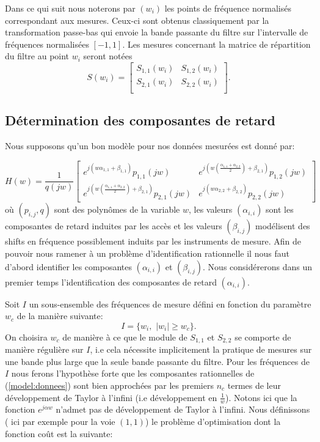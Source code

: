 \documentclass[12]{article}
\begin{document}
Dans ce qui suit nous noterons par $(w_i)$ les points de fr\'equence
normalis\'es correspondant aux mesures. Ceux-ci sont obtenus
classiquement par la transformation passe-bas qui envoie la bande
passante du filtre sur l'intervalle de fr\'equences normalis\'ees
$[-1,1]$. Les mesures concernant la matrice de r\'epartition du filtre
au point $w_i$ seront not\'ees
$$
S(w_i)=\left[
\begin{array}{cc}
S_{1,1}(w_i) & S_{1,2}(w_i) \\
S_{2,1}(w_i) & S_{2,2}(w_i) \\
\end{array}
\right].
$$

\subsection{D\'etermination des composantes de retard}
\label{sec:detret}
Nous supposons qu'un \og bon \fg mod\`ele pour nos donn\'ees mesur\'ees
est donn\'e par: 

\begin{equation}
\label{model:donnees}
H(w)=\frac{1}{q(jw)} \left[
\begin{array}{cc}
e^{j(w\alpha_{1,1}+\beta_{1,1})} p_{1,1}(jw) &
e^{j(w(\frac{\alpha_{1,1}+\alpha_{2,2}}{2})+\beta_{2,1})} p_{1,2}(jw) \\
e^{j(w(\frac{\alpha_{1,1}+\alpha_{2,2}}{2})+\beta_{2,1})} p_{2,1}(jw)& 
e^{j(w\alpha_{2,2}+\beta_{2,2})} p_{2,2}(jw) 
\end{array}
\right]
\end{equation}
o\`u $(p_{i,j},q)$ sont des polyn\^omes de la
variable $w$, les valeurs $(\alpha_{i,i})$ sont les composantes de retard
induites par les acc\`es et les valeurs $(\beta_{i,j})$ mod\'elisent des shifts
en fr\'equence possiblement induits par les instruments de mesure. Afin
de pouvoir nous ramener \`a un probl\`eme d'identification rationnelle
il nous faut d'abord identifier les composantes $(\alpha_{i,i})$ et
$(\beta_{i,j})$.  Nous
consid\'ererons dans un premier temps l'identification des composantes
de retard $(\alpha_{i,i})$.

Soit $I$ un sous-ensemble des fr\'equences 
de mesure d\'efini en fonction du param\`etre $w_c$ de la mani\`ere
suivante:
\begin{equation}
\label{wc:def}
I=\{w_i,\,\,|w_i| \geq w_c \}.
\end{equation}
On choisira $w_c$ de mani\`ere \`a ce que le module de $S_{1,1}$ et
$S_{2,2}$ se comporte de mani\`ere \og r\'eguli\`ere \fg sur $I$, i.e cela
n\'ecessite implicitement la pratique de mesures sur une 
bande plus large que la seule bande passante du filtre. Pour les
fr\'equences de $I$ nous ferons l'hypoth\`ese forte que les composantes
rationnelles de (\ref{model:donnees}) sont bien approch\'ees par les premiers
$n_c$ termes de leur d\'eveloppement de Taylor \`a l'infini (i.e
d\'eveloppement en $\frac{1}{w}$). Notons ici que la fonction $e^{j\alpha 
  w}$ n'admet pas de d\'eveloppement de Taylor \`a l'infini. Nous
d\'efinissons ( ici par exemple pour la voie $(1,1)$) le
probl\`eme d'optimisation dont la fonction co\^ut est la suivante:
 
\end{document}
